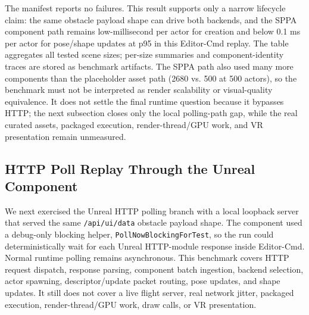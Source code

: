 ﻿\documentclass[11pt,a4paper]{article}
\begin{document}
The manifest reports no failures. This result supports only a narrow lifecycle
claim: the same obstacle payload shape can drive both backends, and the SPPA
component path remains low-millisecond per actor for creation and below 0.1 ms
per actor for pose/shape updates at p95 in this Editor-Cmd replay. The table
aggregates all tested scene sizes; per-size summaries and component-identity
traces are stored as benchmark artifacts. The SPPA path also used many more
components than the placeholder asset path (2680 vs. 500 at 500 actors), so the
benchmark must not be interpreted as render scalability or visual-quality
equivalence. It does not settle the final runtime question because it bypasses
HTTP; the next subsection closes only the local polling-path gap, while the real
curated assets, packaged execution, render-thread/GPU work, and VR presentation
remain unmeasured.

\subsection{HTTP Poll Replay Through the Unreal Component}

We next exercised the Unreal HTTP polling branch with a local loopback server
that served the same \texttt{/api/ui/data} obstacle payload shape. The component
used a debug-only blocking helper, \texttt{PollNowBlockingForTest}, so the run
could deterministically wait for each Unreal HTTP-module response inside
Editor-Cmd. Normal runtime polling remains asynchronous. This benchmark covers
HTTP request dispatch, response parsing, component batch ingestion, backend
selection, actor spawning, descriptor/update packet routing, pose updates, and
shape updates. It still does not cover a live flight server, real network
jitter, packaged execution, render-thread/GPU work, draw calls, or VR
presentation.
\end{document}
